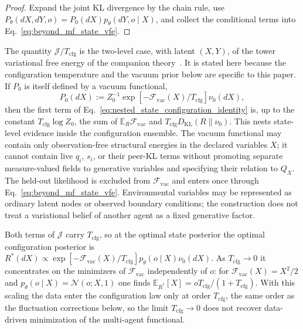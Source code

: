 \begin{proof}
Expand the joint KL divergence by the chain rule, use $P_\theta(dX,dY,o)=P_0(dX)p_\theta(dY,o\mid X)$, and collect the conditional terms into Eq.~\eqref{eq:beyond_mf_state_vfe}.
\end{proof}

The quantity $\mathcal{J}/T_{\mathrm{cfg}}$ is the two-level case, with latent $(X,Y)$, of the tower variational free energy of the companion theory~\cite[Ch.~12]{DennisGaugeVFE2026}. It is stated here because the configuration temperature and the vacuum prior below are specific to this paper. If $P_0$ is itself defined by a vacuum functional,
\begin{equation}
P_0(dX)
:=Z_0^{-1}\exp[-\mathcal{F}_{\mathrm{vac}}(X)/T_{\mathrm{cfg}}]\nu_0(dX),
\label{eq:beyond_mf_configuration_prior}
\end{equation}
then the first term of Eq.~\eqref{eq:nested_state_configuration_identity} is, up to the constant $T_{\mathrm{cfg}}\log Z_0$, the sum of $\mathbb{E}_R\mathcal{F}_{\mathrm{vac}}$ and $T_{\mathrm{cfg}}D_{\mathrm{KL}}(R\|\nu_0)$. This nests state-level evidence inside the configuration ensemble. The vacuum functional may contain only observation-free structural energies in the declared variables $X$; it cannot contain live $q_i$, $s_i$, or their peer-KL terms without promoting separate measure-valued fields to generative variables and specifying their relation to $Q_X$. The held-out likelihood is excluded from $\mathcal{F}_{\mathrm{vac}}$ and enters once through Eq.~\eqref{eq:beyond_mf_state_vfe}. Environmental variables may be represented as ordinary latent nodes or observed boundary conditions; the construction does not treat a variational belief of another agent as a fixed generative factor.

Both terms of $\mathcal{J}$ carry $T_{\mathrm{cfg}}$, so at the optimal state posterior the optimal configuration posterior is $R^*(dX)\propto\exp[-\mathcal{F}_{\mathrm{vac}}(X)/T_{\mathrm{cfg}}]p_\theta(o\mid X)\nu_0(dX)$. As $T_{\mathrm{cfg}}\to0$ it concentrates on the minimizers of $\mathcal{F}_{\mathrm{vac}}$ independently of $o$: for $\mathcal{F}_{\mathrm{vac}}(X)=X^2/2$ and $p_\theta(o\mid X)=\mathcal{N}(o;X,1)$ one finds $\mathbb{E}_{R^*}[X]=oT_{\mathrm{cfg}}/(1+T_{\mathrm{cfg}})$. With this scaling the data enter the configuration law only at order $T_{\mathrm{cfg}}$, the same order as the fluctuation corrections below, so the limit $T_{\mathrm{cfg}}\to0$ does not recover data-driven minimization of the multi-agent functional.

